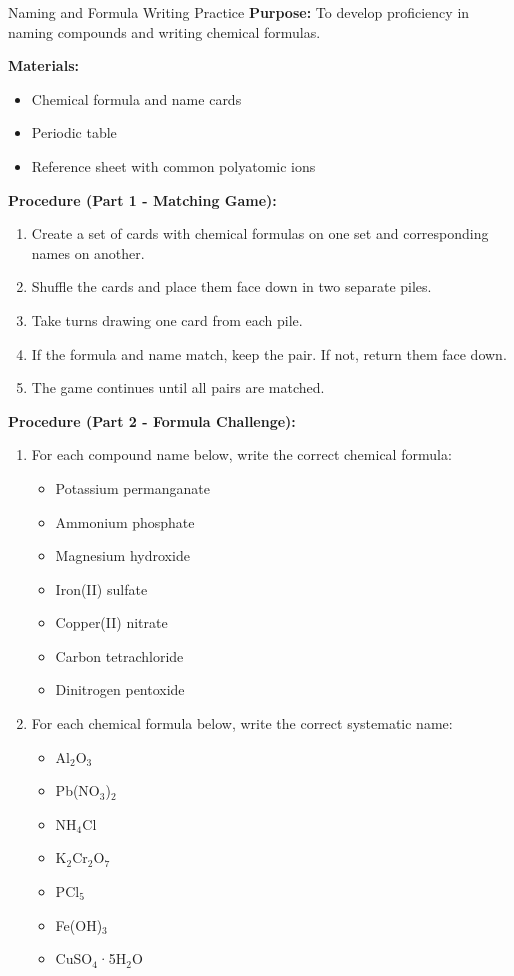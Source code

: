\begin{investigation}{Naming and Formula Writing Practice}
\textbf{Purpose:} To develop proficiency in naming compounds and writing chemical formulas.

\textbf{Materials:}
\begin{itemize}
    \item Chemical formula and name cards
    \item Periodic table
    \item Reference sheet with common polyatomic ions
\end{itemize}

\textbf{Procedure (Part 1 - Matching Game):}
\begin{enumerate}
    \item Create a set of cards with chemical formulas on one set and corresponding names on another.
    \item Shuffle the cards and place them face down in two separate piles.
    \item Take turns drawing one card from each pile.
    \item If the formula and name match, keep the pair. If not, return them face down.
    \item The game continues until all pairs are matched.
\end{enumerate}

\textbf{Procedure (Part 2 - Formula Challenge):}
\begin{enumerate}
    \item For each compound name below, write the correct chemical formula:
    \begin{itemize}
        \item Potassium permanganate
        \item Ammonium phosphate
        \item Magnesium hydroxide
        \item Iron(II) sulfate
        \item Copper(II) nitrate
        \item Carbon tetrachloride
        \item Dinitrogen pentoxide
    \end{itemize}
    
    \item For each chemical formula below, write the correct systematic name:
    \begin{itemize}
        \item Al$_2$O$_3$
        \item Pb(NO$_3$)$_2$
        \item NH$_4$Cl
        \item K$_2$Cr$_2$O$_7$
        \item PCl$_5$
        \item Fe(OH)$_3$
        \item CuSO$_4$·5H$_2$O
    \end{itemize}
\end{enumerate}


\end{investigation}
